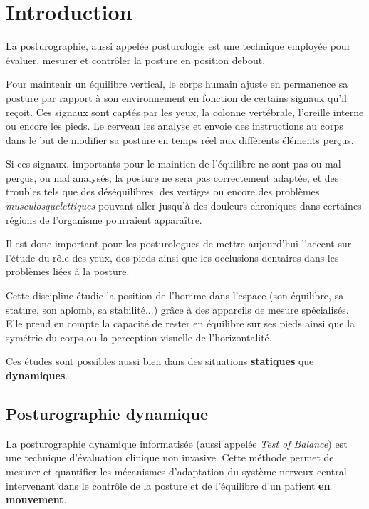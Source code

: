 \section{Introduction}

La posturographie, aussi appelée posturologie est une technique employée pour évaluer,
mesurer et contrôler la posture en position debout.

Pour maintenir un équilibre vertical, le corps humain ajuste en permanence sa posture par rapport 
à son environnement en fonction de certains signaux qu'il reçoit. Ces signaux sont captés par les yeux, la colonne vertébrale, 
l'oreille interne ou encore les pieds. Le cerveau les analyse et envoie des instructions au corps dans le but de modifier 
sa posture en temps réel aux différents éléments perçus.

Si ces signaux, importants pour le maintien de l'équilibre ne sont pas ou mal perçus, ou mal analysés, la posture ne sera pas 
correctement adaptée, et des troubles tels que des déséquilibres, des vertiges ou encore des problèmes \textit{musculosquelettiques} 
pouvant aller jusqu'à des douleurs chroniques dans certaines régions de l'organisme pourraient apparaître.

Il est donc important pour les posturologues de mettre aujourd'hui l'accent sur l'étude du rôle des yeux, des pieds ainsi que les occlusions dentaires 
dans les problèmes liées à la posture.

Cette discipline étudie la position de l’homme dans l’espace (son équilibre,
sa stature, son aplomb, sa stabilité...) grâce à des appareils de mesure spécialisés.
Elle prend en compte la capacité de rester en équilibre sur ses pieds ainsi que la
symétrie du corps ou la perception visuelle de l’horizontalité. 

Ces études sont possibles aussi bien dans des situations
\textbf{statiques} que \textbf{dynamiques}.

\subsection{Posturographie dynamique}

La posturographie dynamique informatisée (aussi appelée \textit{Test of Balance}) est une technique d'évaluation clinique non invasive. 
Cette méthode permet de mesurer et quantifier les mécanismes d'adaptation du système nerveux central intervenant dans le contrôle de la posture et de l'équilibre d'un patient \textbf{en mouvement}.

